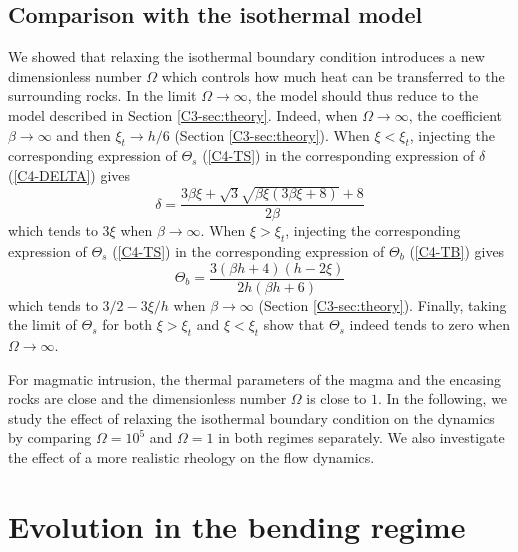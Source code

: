 \subsection{Comparison with the isothermal model}
\label{C4-sec:some-limits}

We showed that relaxing the isothermal boundary condition introduces a
new dimensionless number $\Omega$ which  controls how much heat can be
transferred    to   the    surrounding    rocks.     In   the    limit
$\Omega \rightarrow \infty$, the model should thus reduce to the model
described    in    Section    \ref{C3-sec:theory}.     Indeed,    when
$\Omega\rightarrow \infty$, the  coefficient $\beta\rightarrow \infty$
and then  $\xi_t\rightarrow h/6$ (Section  \ref{C3-sec:theory}).  When
$\xi<\xi_t$,  injecting  the  corresponding expression  of  $\Theta_s$
(\ref{C4-TS})   in   the    corresponding   expression   of   $\delta$
(\ref{C4-DELTA}) gives
\begin{equation}
  \delta =\frac{3 \beta \xi +\sqrt{3} \sqrt{\beta \xi (3 \beta \xi +8)}+8}{2 \beta }
\end{equation}
which  tends   to  $3\xi$  when  $\beta   \rightarrow  \infty$.   When
$\xi>\xi_t$,  injecting  the  corresponding expression  of  $\Theta_s$
(\ref{C4-TS})   in   the   corresponding  expression   of   $\Theta_b$
(\ref{C4-TB}) gives
\begin{equation}
  \Theta_b = \frac{3 (\beta  h+4) (h-2 \xi )}{2 h (\beta  h+6)}
\end{equation}
which tends  to $3/2-3\xi/h$ when $\beta  \rightarrow \infty$ (Section
\ref{C3-sec:theory}). Finally, taking the limit of $\Theta_s$ for both
$\xi>\xi_t$ and $\xi<\xi_t$ show that  $\Theta_s$ indeed tends to zero
when $\Omega\rightarrow \infty$.

For magmatic  intrusion, the thermal  parameters of the magma  and the
encasing  rocks are  close and  the dimensionless  number $\Omega$  is
close to  $1$. In the following,  we study the effect  of relaxing the
isothermal   boundary  condition   on   the   dynamics  by   comparing
$\Omega=10^5$ and  $\Omega = 1$  in both regimes separately.   We also
investigate  the effect  of  a  more realistic  rheology  on the  flow
dynamics.

\section{Evolution in the bending regime}
\label{C4-sec:evol-bend-regime-1}

